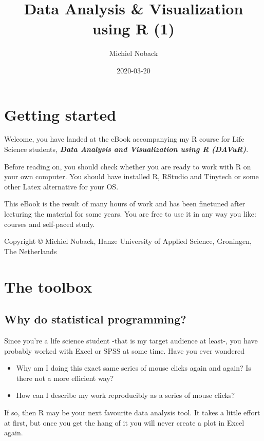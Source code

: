 \documentclass[]{book}
\title{Data Analysis \& Visualization using R (1)}
\author{Michiel Noback}
\date{2020-03-20}
\providecommand{\tightlist}{%
  \setlength{\itemsep}{0pt}\setlength{\parskip}{0pt}}
\begin{document}
\maketitle

{
\setcounter{tocdepth}{1}
\tableofcontents
}
\hypertarget{getting-started}{%
\chapter{Getting started}\label{getting-started}}

Welcome, you have landed at the eBook accompanying my R course for Life Science students, \textbf{\emph{Data Analysis and Visualization using R (DAVuR)}}.

Before reading on, you should check whether you are ready to work with R on your own computer.
You should have installed R, RStudio and Tinytech or some other Latex alternative for your OS.

This eBook is the result of many hours of work and has been finetuned after lecturing the material for some years.
You are free to use it in any way you like: courses and self-paced study.

Copyright © Michiel Noback, Hanze University of Applied Science, Groningen, The Netherlands

\hypertarget{toolbox}{%
\chapter{The toolbox}\label{toolbox}}

\hypertarget{why-do-statistical-programming}{%
\section{Why do statistical programming?}\label{why-do-statistical-programming}}

Since you're a life science student -that is my target audience at least-, you have probably worked with Excel or SPSS at some time. Have you ever wondered

\begin{itemize}
\tightlist
\item
  Why am I doing this exact same series of mouse clicks again and again? Is there not a more efficient way?
\item
  How can I describe my work reproducibly as a series of mouse clicks?
\end{itemize}

If so, then R may be your next favourite data analysis tool.
It takes a little effort at first, but once you get the hang of it you will never create a plot in Excel again.
\end{document}
